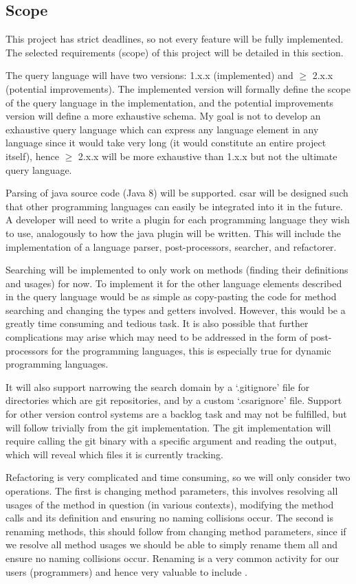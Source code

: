 \documentclass[12pt, letterpaper]{article}
\begin{document}
\subsection{Scope}
This project has strict deadlines, so not every feature will be fully implemented.
The selected requirements (scope) of this project will be detailed in this section.

The query language will have two versions: 1.x.x (implemented) and $ \geq $ 2.x.x (potential improvements).
The implemented version will formally define the scope of the query language in the implementation, and the potential improvements version will define a more exhaustive schema.
My goal is not to develop an exhaustive query language which can express any language element in any language since it would take very long (it would constitute an entire project itself), hence $ \geq $ 2.x.x will be more exhaustive than 1.x.x but not the ultimate query language.

Parsing of java source code (Java 8) will be supported.
csar will be designed such that other programming languages can easily be integrated into it in the future.
A developer will need to write a plugin for each programming language they wish to use, analogously to how the java plugin will be written.
This will include the implementation of a language parser, post-processors, searcher, and refactorer.

Searching will be implemented to only work on methods (finding their definitions and usages) for now.
To implement it for the other language elements described in the query language would be as simple as copy-pasting the code for method searching and changing the types and getters involved.
However, this would be a greatly time consuming and tedious task.
It is also possible that further complications may arise which may need to be addressed in the form of post-processors for the programming languages, this is especially true for dynamic programming languages.

It will also support narrowing the search domain by a `.gitignore' file for directories which are git repositories, and by a custom `.csarignore' file.
Support for other version control systems are a backlog task and may not be fulfilled, but will follow trivially from the git implementation.
The git implementation will require calling the git binary with a specific argument and reading the output, which will reveal which files it is currently tracking.

Refactoring is very complicated and time consuming, so we will only consider two operations.
The first is changing method parameters, this involves resolving all usages of the method in question (in various contexts), modifying the method calls and its definition and ensuring no naming collisions occur.
The second is renaming methods, this should follow from changing method parameters, since if we resolve all method usages we should be able to simply rename them all and ensure no naming collisions occur.
Renaming is a very common activity for our users (programmers) and hence very valuable to include \autocite{murphy2012we}.
\end{document}
